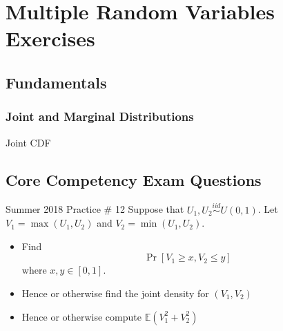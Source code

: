 \documentclass[../main]{subfiles}
\begin{document}
\chapter{Multiple Random Variables Exercises}
\section{Fundamentals}
\subsection{Joint and Marginal Distributions}
\begin{gbox}{Joint CDF}
    
\end{gbox}
\section{Core Competency Exam Questions}
\begin{bbox}{Summer 2018 Practice \# 12}
Suppose that $U_1,U_2 \overset{iid}{\sim}U(0,1)$. Let $V_1 = \max (U_1, U_2)$ and $V_2 = \min(U_1, U_2)$.
\begin{itemize}
    \item Find \[
    \Pr[V_1 \ge x, V_2 \le y]
    \] where $x,y\in[0,1]$.
    \item Hence or otherwise find the joint density for $(V_1, V_2)$
    \item Hence or otherwise compute $\mathbb E(V_1^2 + V_2^2)$
\end{itemize}

\end{bbox}
\end{document}
